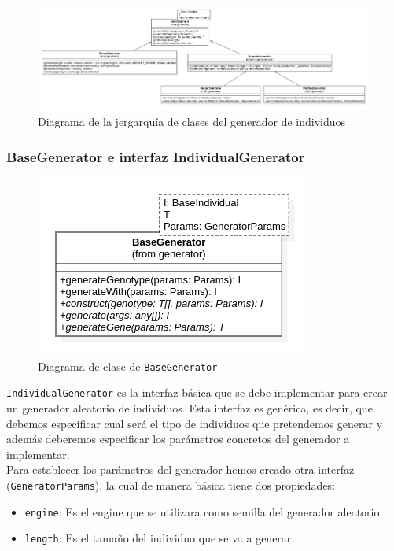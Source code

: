 \begin{figure}[H]
    \centering
    \includegraphics[scale=0.3]{mem/images/cap-4/4.2.3(Generador)/Generator.png}
    \caption{Diagrama de la jergarquía de clases del generador de individuos}
    \label{fig:generator-uml}
\end{figure}

\subsubsection{BaseGenerator e interfaz IndividualGenerator}

\begin{figure}[ht]
    \centering
    \includegraphics[scale=0.5]{mem/images/cap-4/4.2.3(Generador)/BaseGenerator.png}
    \caption{Diagrama de clase de \texttt{BaseGenerator}}
    \label{fig:generator-uml}
\end{figure}

\texttt{IndividualGenerator} es la interfaz básica que se debe implementar para crear un generador aleatorio de individuos. Esta interfaz es genérica, es decir, que debemos especificar cual será el tipo de individuos que pretendemos generar y además deberemos especificar los parámetros concretos del generador a implementar. \\

Para establecer los parámetros del generador hemos creado otra interfaz (\texttt{GeneratorParams}), la cual de manera básica tiene dos propiedades: 

\begin{itemize}
    \item \texttt{engine}: Es el engine que se utilizara como semilla del generador aleatorio.
    \item \texttt{length}: Es el tamaño del individuo que se va a generar.
\end{itemize}


